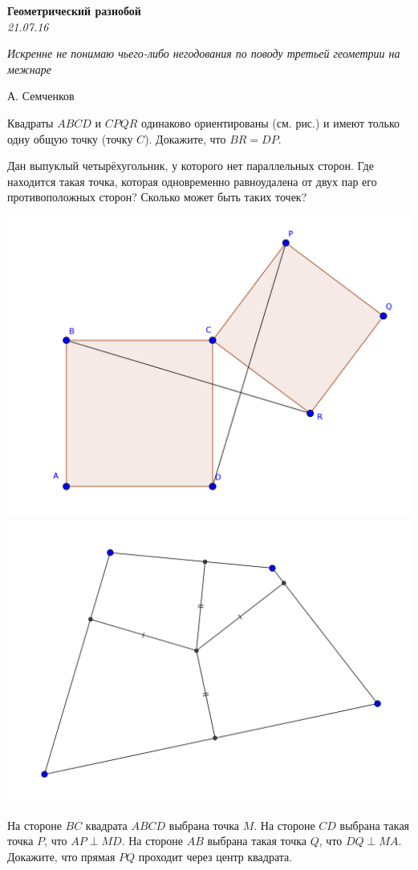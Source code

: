 \renewcommand{\baselinestretch}{0.8}
\parskip

\begin{center}
\textbf{\Large Геометрический разнобой}\\
\textit{21.07.16}
\end{center}

\epigraph{\it Искренне не понимаю чьего-либо негодования по поводу третьей геометрии на межнаре}{А. Семченков}

\begin{problems}
\item Квадраты $ABCD$ и $CPQR$ одинаково ориентированы (см. рис.) и имеют только одну общую точку (точку $C$). Докажите, что $BR=DP$.

\item Дан выпуклый четырёхугольник, у которого нет параллельных сторон. Где находится такая точка, которая одновременно равноудалена от двух пар его противоположных сторон? Сколько может быть таких точек?

\begin{center}
	\includegraphics[width=.45\textwidth]{georazn01}
	\includegraphics[width=.45\textwidth]{georazn02}
\end{center}

\item На стороне $BC$ квадрата $ABCD$ выбрана точка $M$. На стороне $CD$ выбрана такая точка $P$, что $AP\perp MD$. На стороне $AB$ выбрана такая точка $Q$, что $DQ\perp MA$. Докажите, что прямая $PQ$ проходит через центр квадрата.


\end{problems}
